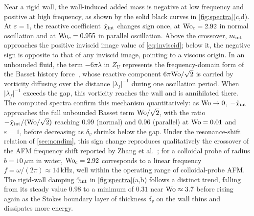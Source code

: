 Near a rigid wall, the wall-induced added mass is negative at low frequency and positive at high frequency, as shown by
the solid black curves in \cref{fig:spectra}(c,d). At $\varepsilon=1$, the reactive coefficient $\hat\chi_{\rm int}$
changes sign once, at $\mathrm{Wo}_c=2.92$ in normal oscillation and at $\mathrm{Wo}_c=0.955$ in parallel oscillation. Above the crossover,
$m_{\rm int}$ approaches the positive inviscid image value of \cref{eq:inviscid}; below it, the negative sign is opposite
to that of any inviscid image, pointing to a viscous origin. In an unbounded fluid, the term $-6\pi\lambda$ in $Z_U$
represents the frequency-domain form of the Basset history force~\cite{maxey1983equation}, whose reactive component
$6\pi\mathrm{Wo}/\sqrt2$ is carried by vorticity diffusing over the distance $|\lambda_f|^{-1}$ during one oscillation period.
When $|\lambda_f|^{-1}$ exceeds the gap, this vorticity reaches the wall and is annihilated there. The computed spectra
confirm this mechanism quantitatively: as $\mathrm{Wo}\to0$, $-\hat\chi_{\rm int}$ approaches the full unbounded Basset term
$\mathrm{Wo}/\sqrt2$, with the ratio $-\hat\chi_{\rm int}/(\mathrm{Wo}/\sqrt2)$ reaching $0.99$ (normal) and $0.96$ (parallel) at
$\mathrm{Wo}=0.01$ and $\varepsilon=1$, before decreasing as $\delta_v$ shrinks below the gap.  Under the resonance-shift relation of \cref{sec:nondim}, this sign change reproduces
qualitatively the crossover of the AFM frequency shift reported by Zhang et al.~\cite{zhang2023unsteady}; for a colloidal
probe of radius $b=10\,\mu$m in water, $\mathrm{Wo}_c=2.92$ corresponds to a linear frequency $f=\omega/(2\pi)\approx14$\,kHz,
well within the operating range of colloidal-probe AFM. The rigid-wall damping $\hat\gamma_{\rm int}$ in
\cref{fig:spectra}(a,b) follows a distinct trend, falling from its steady value $0.98$ to a minimum of $0.31$ near
$\mathrm{Wo}\approx3.7$ before rising again as the Stokes boundary layer of thickness $\delta_v$ on the wall thins and dissipates
more energy.

